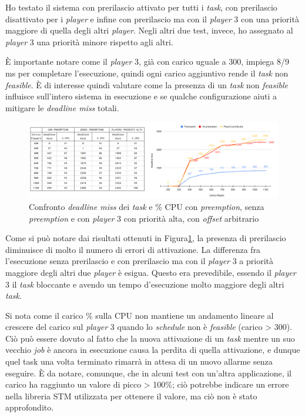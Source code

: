 \documentclass{article}
\begin{document}
Ho testato il sistema con prerilascio attivato per tutti i \textit{task}, con prerilascio disattivato per i \textit{player} e infine con prerilascio ma con il \textit{player} 3 con una priorità maggiore di quella degli altri \textit{player}. Negli altri due test, invece, ho assegnato  al \textit{player} 3 una priorità minore rispetto agli altri.

È importante notare come il \textit{player} 3, già con carico uguale a 300, impiega 8/9 ms per completare l'esecuzione, quindi ogni carico aggiuntivo rende il \textit{task} non \textit{feasible}. È di interesse quindi valutare come la presenza di un \textit{task} non \textit{feasible} influisce sull'intero sistema in esecuzione e se qualche configurazione aiuti a mitigare le \textit{deadline miss} totali.
\begin{figure}[H]
	\centering
	\includegraphics[width=7in]{image/CARICO-OFFSET.png}
	\caption{Confronto \textit{deadline miss} dei \textit{task} e \% CPU con \textit{preemption}, senza \textit{preemption} e con \textit{player} 3 con priorità alta, con \textit{offset} arbitrario}
	\label{siC-siO}
\end{figure}
Come si può notare dai risultati ottenuti in Figura\ref{siC-siO}, la presenza di prerilascio diminuisce di molto il numero di errori di attivazione. La differenza fra l'esecuzione senza prerilascio e con prerilascio ma con il \textit{player} 3 a priorità maggiore degli altri due \textit{player} è esigua. Questo era prevedibile, essendo il \textit{player} 3 il \textit{task} bloccante e avendo un tempo d'esecuzione molto maggiore degli altri \textit{task}. 

Si nota come il carico \% sulla CPU non mantiene un andamento lineare al crescere del carico sul \textit{player} 3 quando lo \textit{schedule} non è \textit{feasible} (carico > 300). Ciò può essere dovuto al fatto che la nuova attivazione di un \textit{task} mentre un suo vecchio \textit{job} è ancora in esecuzione causa la perdita di quella attivazione, e dunque quel task una volta terminato rimarrà in attesa di un nuovo allarme senza eseguire. È da notare, comunque, che in alcuni test con un'altra applicazione, il carico ha raggiunto un valore di picco > 100\%; ciò potrebbe indicare un errore nella libreria STM utilizzata per ottenere il valore, ma ciò non è stato approfondito.
\end{document}
